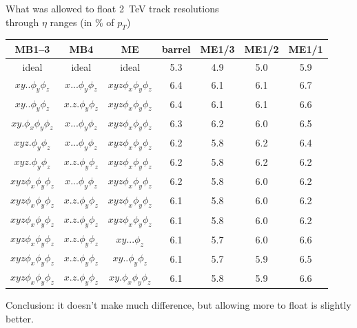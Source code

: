 \documentclass[compress]{beamer}
\begin{document}
\begin{frame}
What was allowed to float \hfill 2~TeV track resolutions \\
\hfill through $\eta$ ranges (in \% of $p_T$)

\vspace{0.2 cm}
\begin{minipage}{1.1\linewidth}
\small
\begin{tabular}{c c c | c c c c}
MB1--3 & MB4 & ME & barrel & ME1/3 & ME1/2 & ME1/1 \\\hline

ideal & ideal & ideal & 5.3  &  4.9  &  5.0  &  5.9  \\\hline

$xy..\phi_y\phi_z$ & $x...\phi_y\phi_z$ & $xyz\phi_x\phi_y\phi_z$ &  6.4  &  6.1  &  6.1  &  6.7  \\
$xy..\phi_y\phi_z$ & $x.z.\phi_y\phi_z$ & $xyz\phi_x\phi_y\phi_z$ &  6.4  &  6.1  &  6.1  &  6.6  \\
$xy.\phi_x\phi_y\phi_z$ & $x...\phi_y\phi_z$ & $xyz\phi_x\phi_y\phi_z$ &  6.3  &  6.2  &  6.0  &  6.5  \\
$xyz.\phi_y\phi_z$ & $x...\phi_y\phi_z$ & $xyz\phi_x\phi_y\phi_z$ &  6.2  &  5.8  &  6.2  &  6.4  \\
$xyz.\phi_y\phi_z$ & $x.z.\phi_y\phi_z$ & $xyz\phi_x\phi_y\phi_z$ &  6.2  &  5.8  &  6.2  &  6.2  \\
$xyz\phi_x\phi_y\phi_z$ & $x...\phi_y\phi_z$ & $xyz\phi_x\phi_y\phi_z$ &  6.2  &  5.8  &  6.0  &  6.2  \\
$xyz\phi_x\phi_y\phi_z$ & $x.z.\phi_y\phi_z$ & $xyz\phi_x\phi_y\phi_z$ &  6.1  &  5.8  &  6.0  &  6.2  \\\hline

$xyz\phi_x\phi_y\phi_z$ & $x.z.\phi_y\phi_z$ & $xyz\phi_x\phi_y\phi_z$ &  6.1  &  5.8  &  6.0  &  6.2  \\
$xyz\phi_x\phi_y\phi_z$ & $x.z.\phi_y\phi_z$ & $xy...\phi_z$ &  6.1  &  5.7  &  6.0  &  6.6  \\
$xyz\phi_x\phi_y\phi_z$ & $x.z.\phi_y\phi_z$ & $xy..\phi_y\phi_z$ &  6.1  &  5.7  &  5.9  &  6.5  \\
$xyz\phi_x\phi_y\phi_z$ & $x.z.\phi_y\phi_z$ & $xy.\phi_x\phi_y\phi_z$ &  6.1  &  5.8  &  5.9  &  6.6  \\
\end{tabular}
\end{minipage}

\vspace{0.2 cm} Conclusion: it doesn't make much difference, but allowing more to float is slightly better.
\end{frame}
\end{document}
